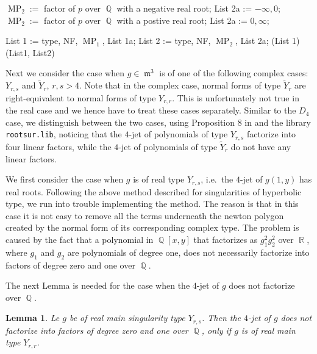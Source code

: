 \documentclass[noend]{amsproc}
\newtheorem{lemma}[theorem]{Lemma}
\theoremstyle{definition}
\DeclareMathOperator{\MP}{MP}
\DeclareMathOperator{\m}{\mathfrak{m}}
\DeclareMathOperator{\Q}{\mathbb{Q}}
\DeclareMathOperator{\R}{\mathbb{R}}
\begin{document}
\begin{algorithm}[ht]
\begin{algorithmic}[1]
\State $\MP_2 := $ factor of $p$ over $\Q$ with a negative real root;
\State List 2a := $-\infty, 0$;
\Else
\State $\MP_2 := $ factor of $p$ over $\Q$ with a postive real root;
\State List 2a := $0, \infty$;
\EndIf
\EndIf

\State List 1 := type, NF, $\MP_1$, List 1a;
\State List 2 := type, NF, $\MP_2$, List 2a;
\Return (List 1)
\Else
\Return (List1, List2)
\EndIf
\end{algorithmic}
\end{algorithm}
\clearpage

Next we consider the case when $g\in\m^3$ is of one of the following complex cases:
$Y_{r,s}$ and $\widetilde Y_r$, $r,s>4$. Note that in the complex case, normal
forms of type $\widetilde Y_r$ are right-equivalent to normal forms of type
$Y_{r,r}$. This is unfortunately not true in the real case and we hence have to
treat these cases separately.  Similar to the $D_4$ case, we distinguish
between the two cases, using Proposition 8 in \cite{realclassify1} and the library {\tt rootsur.lib},
noticing that the $4$-jet of polynomials of type $Y_{r,s}$ factorize into four
linear factors, while the $4$-jet of polynomials of type $\widetilde Y_r$ do
not have any linear factors.

We first consider the case when $g$ is of real type $Y_{r,s}$, i.e.~the $4$-jet of $g(1,y)$ has real roots. Following the above method described for singularities of hyperbolic type, we run into trouble implementing the method. The reason is that in this case it is not easy to remove all the terms underneath the newton polygon created by the normal form of its corresponding complex type. The problem is caused by the fact that a polynomial in $\Q[x,y]$ that factorizes as $g_1^2g_2^2$ over $\R$, where $g_1$ and $g_2$ are polynomials of degree one, does not necessarily factorize into factors of degree zero and one over $\Q$. 

The next Lemma is needed for the case when the $4$-jet of $g$ does not factorize over $\Q$.

\begin{lemma}\label{IrrationalPoints}
Le $g$ be of real main singularity type $Y_{r,s}$. Then the $4$-jet of $g$ does not factorize into factors of degree zero and one over $\Q$, only if $g$ is of real main type $Y_{r,r}$.
\end{lemma}
\end{document}
